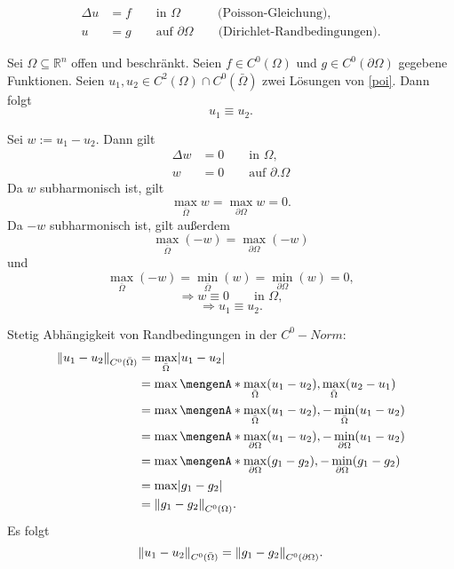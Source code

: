\begin{align}\label{poi}\tag{p}
	\Delta u &= f \qquad \text{in }\Omega \qquad \quad \text{(Poisson-Gleichung),}\\
	u&=g \qquad \text{auf }\partial \Omega \qquad \text{(Dirichlet-Randbedingungen).}
 \end{align}

\begin{korollar}
	Sei $\Omega \subseteq \mathbb{R}^n$ offen und beschränkt. Seien $f \in C^0(\Omega)$ und $g \in C^0(\partial \Omega)$ gegebene Funktionen. Seien $u_1,u_2 \in C^2(\Omega)\cap C^0(\bar{\Omega})$ zwei Lösungen von \eqref{poi}. Dann folgt
	\begin{equation}
		u_1 \equiv u_2.
	\end{equation}
\end{korollar}
\begin{beweis}
	Sei $w := u_1 - u_2$. Dann gilt
	\begin{align}
		\Delta w &= 0 \qquad \text{in }\Omega, \\
		w &= 0 \qquad \text{auf }\partial. \Omega
	\end{align}
	Da $w$ subharmonisch ist, gilt
	\begin{equation}
		\max_{\bar{\Omega}} w = \max_{\partial \Omega} w = 0.
	\end{equation}
	Da $-w$ subharmonisch ist, gilt außerdem
	\begin{equation} 
		\max_{\bar{\Omega}}(-w) = \max_{\partial \Omega}(-w)
	\end{equation}
	und \begin{equation}
		\max_{\bar{\Omega}}(-w) = \min_{\bar{\Omega}}(w) = \min_{\partial \Omega}(w) = 0,
	\end{equation}
	\begin{equation}
		\Rightarrow w \equiv 0 \qquad \text{in }\Omega,
	\end{equation}
	\[
		\Rightarrow u_1 \equiv u_2.
	\]
	\end{beweis}
Stetig Abhängigkeit von Randbedingungen in der $C^0-Norm$:
\begin{align*}
	\norm{u_1-u_2}_{C^0(\bar{\Omega})} &= \max_{\bar{\Omega}} \abs{u_1-u_2} \\
	&= \max \set{ \max_{\bar{\Omega}} (u_1-u_2), \max_{\bar{\Omega}}(u_2-u_1) } \\
	&= \max \set{ \max_{\bar{\Omega}} (u_1-u_2), -\min_{\bar{\Omega}}(u_1-u_2) } \\
	&= \max \set{ \max_{\partial \Omega} (u_1-u_2), -\min_{\partial \Omega}(u_1-u_2) } \\
	&= \max \set{ \max_{\partial \Omega} (g_1-g_2), -\min_{\partial \Omega}(g_1-g_2) } \\
	&= \max \abs{g_1-g_2} \\
	&= \norm{g_1-g_2}_{C^0(\Omega)}.
\end{align*}
Es folgt
\[
	\norm{u_1-u_2}_{C^0(\bar{\Omega})} = \norm{g_1-g_2}_{C^0(\partial \Omega)}.
\]


